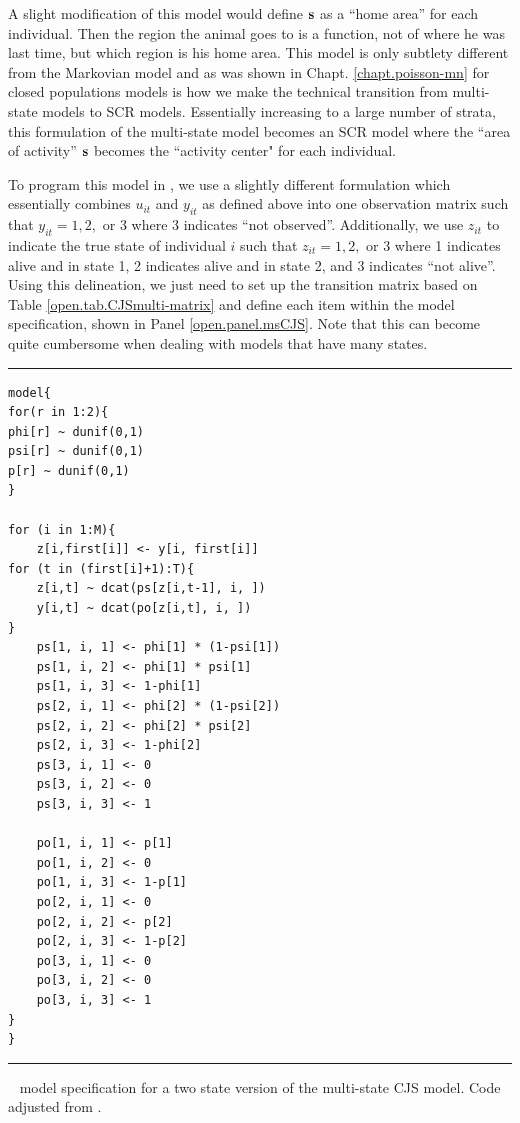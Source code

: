 A slight modification of this model would define ${\bf s}$  as a
``home area'' %
 for each individual. Then
the region the animal goes to is a function, not of where he was last time, but which region is his home area.
This model is only subtlety different from the Markovian model and as was shown in Chapt. \ref{chapt.poisson-mn}
for closed populations models is how we make the technical transition from multi-state models to SCR models.
Essentially increasing to a large number of strata, this formulation of the multi-state model becomes an SCR model
where the ``area of activity'' ${\bf s}$ becomes the ``activity center" for
each individual. 

To program this model in \jags, we use a slightly different formulation which essentially combines
$u_{it}$ and $y_{it}$ as defined above into one observation matrix such that $y_{it} = 1, 2,$ or $3$ where
3 indicates ``not observed''.  Additionally, we use $z_{it}$ to indicate the true state of individual
$i$ such that $z_{it} = 1, 2,$ or $3$ where 1 indicates alive and in state 1, 2 indicates alive and in state 2,
and 3 indicates ``not alive''.  Using this delineation, we just need to set up the transition
matrix based on Table \ref{open.tab.CJSmulti-matrix}
and define each item within the model specification, shown in Panel \ref{open.panel.msCJS}.
Note that this can become quite cumbersome when dealing with models that
have many states.

\begin{panel}[htp]
\centering
\rule[0.1in]{\textwidth}{.03in}
{\small
\begin{verbatim}
model{
for(r in 1:2){
phi[r] ~ dunif(0,1)
psi[r] ~ dunif(0,1)
p[r] ~ dunif(0,1)
}

for (i in 1:M){
    z[i,first[i]] <- y[i, first[i]]
for (t in (first[i]+1):T){
    z[i,t] ~ dcat(ps[z[i,t-1], i, ])
    y[i,t] ~ dcat(po[z[i,t], i, ])
}
	ps[1, i, 1] <- phi[1] * (1-psi[1])
	ps[1, i, 2] <- phi[1] * psi[1]
	ps[1, i, 3] <- 1-phi[1]
	ps[2, i, 1] <- phi[2] * (1-psi[2])
	ps[2, i, 2] <- phi[2] * psi[2]
	ps[2, i, 3] <- 1-phi[2]
	ps[3, i, 1] <- 0
	ps[3, i, 2] <- 0
	ps[3, i, 3] <- 1

	po[1, i, 1] <- p[1]
	po[1, i, 2] <- 0
	po[1, i, 3] <- 1-p[1]
	po[2, i, 1] <- 0
	po[2, i, 2] <- p[2]
	po[2, i, 3] <- 1-p[2]
	po[3, i, 1] <- 0
	po[3, i, 2] <- 0
	po[3, i, 3] <- 1
}
}
\end{verbatim}
}

\rule[-0.1in]{\textwidth}{.03in}
\caption{
\jags~ model specification for a two state version of the multi-state CJS model. Code adjusted
from \cite[][Chapt. 9]{kery_schaub:2011}. }
\label{open.panel.msCJS}
\end{panel}


